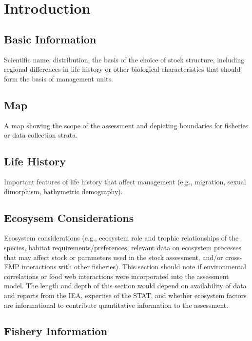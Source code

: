 \documentclass[12pt,]{article}
\begin{document}
\section{Introduction}\label{introduction}

\subsection{Basic Information}\label{basic-information}

Scientific name, distribution, the basis of the choice of stock
structure, including regional differences in life history or other
biological characteristics that should form the basis of management
units.

\subsection{Map}\label{map}

A map showing the scope of the assessment and depicting boundaries for
fisheries or data collection strata.

\subsection{Life History}\label{life-history}

Important features of life history that affect management (e.g.,
migration, sexual dimorphism, bathymetric demography).

\subsection{Ecosysem Considerations}\label{ecosysem-considerations}

Ecosystem considerations (e.g., ecosystem role and trophic relationships
of the species, habitat requirements/preferences, relevant data on
ecosystem processes that may affect stock or parameters used in the
stock assessment, and/or cross-FMP interactions with other fisheries).
This section should note if environmental correlations or food web
interactions were incorporated into the assessment model. The length and
depth of this section would depend on availability of data and reports
from the IEA, expertise of the STAT, and whether ecosystem factors are
informational to contribute quantitative information to the assessment.

\subsection{Fishery Information}\label{fishery-information}
\end{document}
